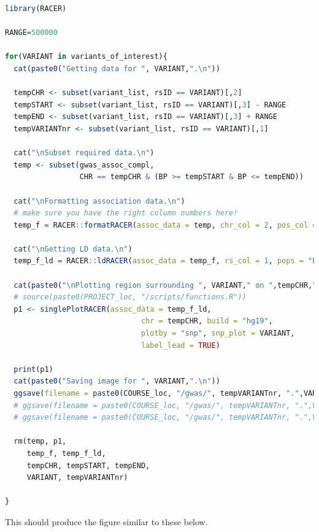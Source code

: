 \documentclass[
]{book}
\begin{document}
\begin{lstlisting}[language=R]
library(RACER)

RANGE=500000

for(VARIANT in variants_of_interest){
  cat(paste0("Getting data for ", VARIANT,".\n"))

  tempCHR <- subset(variant_list, rsID == VARIANT)[,2]
  tempSTART <- subset(variant_list, rsID == VARIANT)[,3] - RANGE
  tempEND <- subset(variant_list, rsID == VARIANT)[,3] + RANGE
  tempVARIANTnr <- subset(variant_list, rsID == VARIANT)[,1]

  cat("\nSubset required data.\n")
  temp <- subset(gwas_assoc_compl, 
                 CHR == tempCHR & (BP >= tempSTART & BP <= tempEND))

  cat("\nFormatting association data.\n")
  # make sure you have the right column numbers here!
  temp_f = RACER::formatRACER(assoc_data = temp, chr_col = 2, pos_col = 3, p_col = 14)

  cat("\nGetting LD data.\n")
  temp_f_ld = RACER::ldRACER(assoc_data = temp_f, rs_col = 1, pops = "EUR", lead_snp = VARIANT)
  
  cat(paste0("\nPlotting region surrounding ", VARIANT," on ",tempCHR,":",tempSTART,"-",tempEND,".\n"))
  # source(paste0(PROJECT_loc, "/scripts/functions.R"))
  p1 <- singlePlotRACER(assoc_data = temp_f_ld, 
                               chr = tempCHR, build = "hg19", 
                               plotby = "snp", snp_plot = VARIANT,
                               label_lead = TRUE)
  
  print(p1)
  cat(paste0("Saving image for ", VARIANT,".\n"))
  ggsave(filename = paste0(COURSE_loc, "/gwas/", tempVARIANTnr, ".",VARIANT,".regional_assoc.png"), plot = p1)
  # ggsave(filename = paste0(COURSE_loc, "/gwas/", tempVARIANTnr, ".",VARIANT,".regional_assoc.pdf"), plot = p1)
  # ggsave(filename = paste0(COURSE_loc, "/gwas/", tempVARIANTnr, ".",VARIANT,".regional_assoc.eps"), plot = p1)
  
  rm(temp, p1,
     temp_f, temp_f_ld,
     tempCHR, tempSTART, tempEND,
     VARIANT, tempVARIANTnr)
  
}
\end{lstlisting}

This should produce the figure similar to these below.
\end{document}

